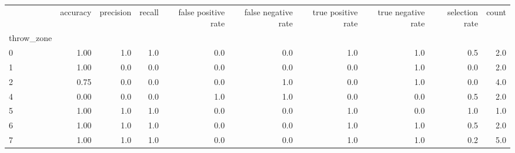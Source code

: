 \begin{tabular}{lrrrrrrrrr}
\toprule
{} &  accuracy &  precision &  recall &  false positive rate &  false negative rate &  true positive rate &  true negative rate &  selection rate &  count \\
throw\_zone &           &            &         &                      &                      &                     &                     &                 &        \\
\midrule
0          &      1.00 &        1.0 &     1.0 &                  0.0 &                  0.0 &                 1.0 &                 1.0 &             0.5 &    2.0 \\
1          &      1.00 &        0.0 &     0.0 &                  0.0 &                  0.0 &                 0.0 &                 1.0 &             0.0 &    2.0 \\
2          &      0.75 &        0.0 &     0.0 &                  0.0 &                  1.0 &                 0.0 &                 1.0 &             0.0 &    4.0 \\
4          &      0.00 &        0.0 &     0.0 &                  1.0 &                  1.0 &                 0.0 &                 0.0 &             0.5 &    2.0 \\
5          &      1.00 &        1.0 &     1.0 &                  0.0 &                  0.0 &                 1.0 &                 0.0 &             1.0 &    1.0 \\
6          &      1.00 &        1.0 &     1.0 &                  0.0 &                  0.0 &                 1.0 &                 1.0 &             0.5 &    2.0 \\
7          &      1.00 &        1.0 &     1.0 &                  0.0 &                  0.0 &                 1.0 &                 1.0 &             0.2 &    5.0 \\
\bottomrule
\end{tabular}
